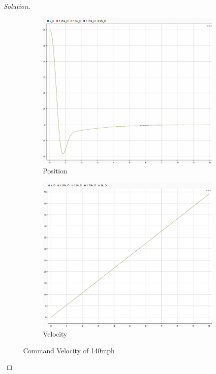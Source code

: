 \documentclass{article}
\begin{document}
\begin{proof}[Solution]
\begin{figure}[h!]
    \centering
    \begin{subfigure}{0.4\linewidth}
      \includegraphics[width=\linewidth]{img30.png}
      \caption{Position}
    \end{subfigure}
    \begin{subfigure}{0.4\linewidth}
      \includegraphics[width=\linewidth]{img31.png}
      \caption{Velocity}
    \end{subfigure}
    \caption{Command Velocity of 140mph}
\end{figure}



\end{proof}
\end{document}
